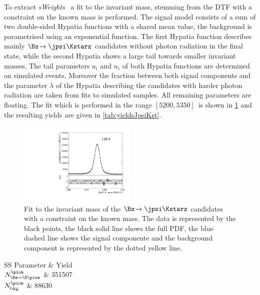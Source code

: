 To extract \emph{sWeights}~\cite{Pivk:2004ty} a fit to the invariant \Bz mass, stemming from the DTF with a constraint on the known \jpsi mass is performed.
The signal model consists of a sum of two double-sided Hypatia functions with a shared mean value, the background is parametrised using an exponential function.
The first Hypatia function describes mainly $\Bz\!\to\jpsi\Kstarz$ candidates without photon radiation in the final state, while the second Hypatia shows a large tail towards smaller invariant masses.
The tail parameters $a_i$ and $n_i$ of both Hypatia functions are determined on simulated events.
Moreover the fraction between both signal components and the parameter $\lambda$ of the Hypatia describing the \Bz candidates with harder photon radiation are taken from fits to simulated samples.
All remaining parameters are floating.
The fit which is performed in the range $[5200, 5350]\,$\si[per-mode=symbol]{\MeVcc} is shown in \cref{fig:massFitJpsiKst} and the resulting yields are given in \cref{tab:yieldsJpsiKst}.
\begin{figure}[tbp]
    \centering
    \includegraphics[width=0.5\textwidth]{08FlavourTagging/figs/BmassJpsiKst_pull.pdf}
    \caption{Fit to the invariant mass of the $\Bz\!\to\jpsi\Kstarz$ candidates with a constraint on the known \jpsi mass.
    The data is represented by the black points, the black solid line shows the full PDF, the blue dashed line shows the signal componente and the background component is represented by the dotted yellow line.}
    \label{fig:massFitJpsiKst}
\end{figure}
\begin{table}[tbp]
	\centering
	\caption{Fitted Yields of the $\Bz\!\to\jpsi\Kstarz$ component and the combinatorial background.}
	\begin{tabular}{SS}
		\toprule
		{Parameter} & {Yield} \\
		\midrule
		{$N_{\Bz\!\to\D\pion}^{\pion}$}	& 351507 \\
		{$N_{\text{bkg}}^{\pion}$}		& 88630 \\
		\bottomrule
	\end{tabular}
	\label{tab:yieldsJpsiKst}
\end{table}


